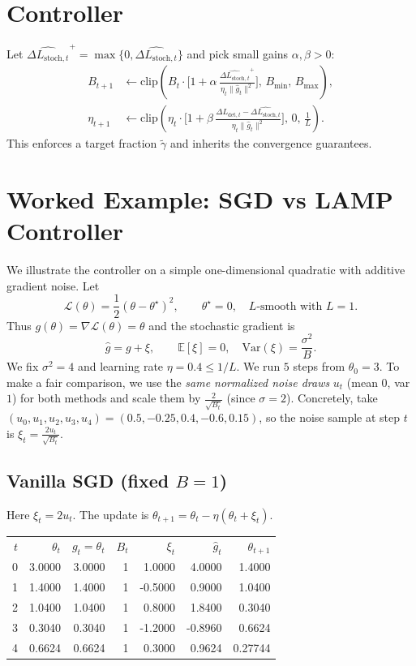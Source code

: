 \documentclass[12pt]{article}
\begin{document}
\section{Controller}
Let $\widehat{\Delta L_{\mathrm{stoch},t}}^+=\max\{0,\widehat{\Delta L_{\mathrm{stoch},t}}\}$ and pick small gains $\alpha,\beta>0$:
\[
\begin{aligned}
B_{t+1}&\leftarrow \mathrm{clip}\!\left(B_t \cdot \Big[1+\alpha\,\frac{\widehat{\Delta L_{\mathrm{stoch},t}}^+}{\eta_t\|\widehat g_t\|^2}\Big],\,B_{\min},\,B_{\max}\right),\\
\eta_{t+1}&\leftarrow \mathrm{clip}\!\left(\eta_t \cdot \Big[1+\beta\,\frac{\Delta L_{\mathrm{det},t}-\widehat{\Delta L_{\mathrm{stoch},t}}}{\eta_t\|\widehat g_t\|^2}\Big],\,0,\,\tfrac{1}{L}\right).
\end{aligned}
\]
This enforces a target fraction $\tilde\gamma$ and inherits the convergence guarantees.

\section{Worked Example: SGD vs LAMP Controller}

We illustrate the controller on a simple one-dimensional quadratic with additive gradient noise. Let
\[
\mathcal{L}(\theta)=\frac{1}{2}(\theta-\theta^\star)^2,\qquad \theta^\star=0,\quad L\text{-smooth with }L=1.
\]
Thus $g(\theta)=\nabla \mathcal{L}(\theta)=\theta$ and the stochastic gradient is
\[
\widehat g = g + \xi,\qquad \mathbb{E}[\xi]=0,\quad \mathrm{Var}(\xi)=\frac{\sigma^2}{B}.
\]
We fix $\sigma^2=4$ and learning rate $\eta=0.4\le 1/L$. We run $5$ steps from $\theta_0=3$.
To make a fair comparison, we use the \emph{same normalized noise draws} $u_t$ (mean $0$, var $1$) for both methods and scale them by $\frac{2}{\sqrt{B_t}}$ (since $\sigma=2$). Concretely, take $(u_0,u_1,u_2,u_3,u_4)=(0.5,-0.25,0.4,-0.6,0.15)$, so the noise sample at step $t$ is $\xi_t=\frac{2u_t}{\sqrt{B_t}}$.

\subsection{Vanilla SGD (fixed $B=1$)}
Here $\xi_t=2u_t$. The update is $\theta_{t+1}=\theta_t-\eta(\theta_t+\xi_t)$.

\begin{center}
\small
\begin{tabular}{@{}rrrrrrr@{}}
$t$ & $\theta_t$ & $g_t=\theta_t$ & $B_t$ & $\xi_t$ & $\widehat g_t$ & $\theta_{t+1}$ \\
0 & 3.0000 & 3.0000 & 1 & \phantom{-}1.0000 & \phantom{-}4.0000 & 1.4000 \\
1 & 1.4000 & 1.4000 & 1 & -0.5000 & \phantom{-}0.9000 & 1.0400 \\
2 & 1.0400 & 1.0400 & 1 & \phantom{-}0.8000 & \phantom{-}1.8400 & 0.3040 \\
3 & 0.3040 & 0.3040 & 1 & -1.2000 & -0.8960 & 0.6624 \\
4 & 0.6624 & 0.6624 & 1 & \phantom{-}0.3000 & \phantom{-}0.9624 & 0.27744 \\
\end{tabular}
\end{center}
\end{document}
